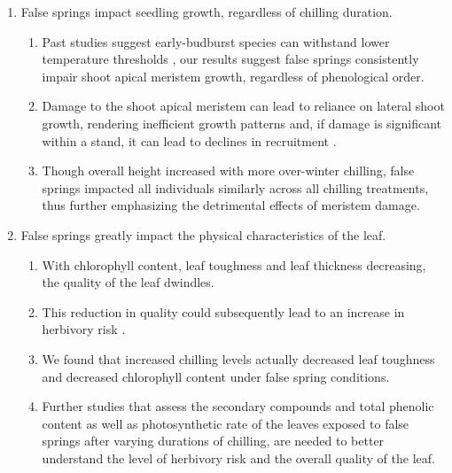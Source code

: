 \documentclass{article}\usepackage[]{graphicx}\usepackage[]{color}
\begin{document}
\begin{enumerate}
\item False springs impact seedling growth, regardless of chilling duration.
  \begin{enumerate}
  \item Past studies suggest early-budburst species can withstand lower temperature thresholds \citep{Lenz2013, Muffler2016, Zohner2020}, our results suggest false springs consistently impair shoot apical meristem growth, regardless of phenological order. 
  \item Damage to the shoot apical meristem can lead to reliance on lateral shoot growth, rendering inefficient growth patterns and, if damage is significant within a stand, it can lead to declines in recruitment \citep{Rhodes2018}. 
  \item Though overall height increased with more over-winter chilling, false springs impacted all individuals similarly across all chilling treatments, thus further emphasizing the detrimental effects of meristem damage. 
  \end{enumerate}
  
\item False springs greatly impact the physical characteristics of the leaf.
  \begin{enumerate}
  \item With chlorophyll content, leaf toughness and leaf thickness decreasing, the quality of the leaf dwindles.
  \item This reduction in quality could subsequently lead to an increase in herbivory risk \citep{Onoda2011}.
  \item We found that increased chilling levels actually decreased leaf toughness and decreased chlorophyll content under false spring conditions.
  \item Further studies that assess the secondary compounds and total phenolic content \citep{Ayres1993, Webber2016} as well as photosynthetic rate of the leaves exposed to false springs after varying durations of chilling, are needed to better understand the level of herbivory risk and the overall quality of the leaf.
  \end{enumerate}


\end{enumerate}
\end{document}
